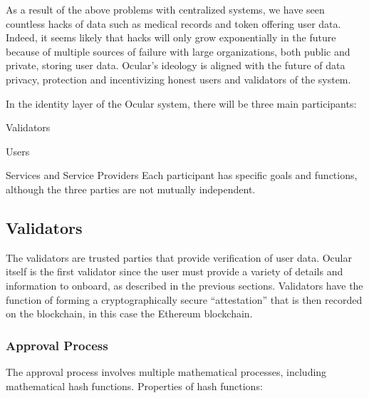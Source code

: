 \documentclass[12pt]{article}
\let\tempone\itemize
\let\temptwo\enditemize
\renewenvironment{itemize}{\tempone\addtolength{\itemsep}{-5pt}}{\temptwo}
\begin{document}
As a result of the above problems with centralized systems, we have seen countless hacks of data such as medical records and token offering user data. Indeed, it seems likely that hacks will only grow exponentially in the future because of multiple sources of failure with large organizations, both public and private, storing user data. Ocular's ideology is aligned with the future of data privacy, protection and incentivizing honest users and validators of the system.

In the identity layer of the Ocular system, there will be three main participants:
\begin{itemize}
\item Validators
\item Users
\item Services and Service Providers
\end{itemize}
Each participant has specific goals and functions, although the three parties are not mutually independent. 
\subsection{Validators}
The validators are trusted parties that provide verification of user data. Ocular itself is the first validator since the user must provide a variety of details and information to onboard, as described in the previous sections. Validators have the function of forming a cryptographically secure ``attestation'' that is then recorded on the blockchain, in this case the Ethereum blockchain. 

\subsubsection*{Approval Process}
The approval process involves multiple mathematical processes, including mathematical hash functions. Properties of hash functions:
\end{document}
